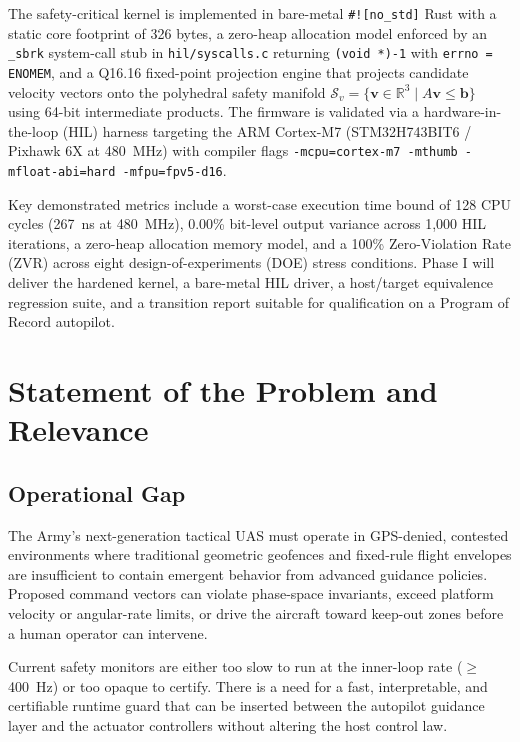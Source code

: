 \documentclass[11pt,oneside]{article}
\begin{document}
The safety-critical kernel is implemented in bare-metal \texttt{\#![no\_std]} Rust with a static core footprint of 326 bytes, a zero-heap allocation model enforced by an \texttt{\_sbrk} system-call stub in \texttt{hil/syscalls.c} returning \texttt{(void *)-1} with \texttt{errno = ENOMEM}, and a Q16.16 fixed-point projection engine that projects candidate velocity vectors onto the polyhedral safety manifold $\mathcal{S}_v = \{ \mathbf{v} \in \mathbb{R}^3 \mid A \mathbf{v} \le \mathbf{b} \}$ using 64-bit intermediate products. The firmware is validated via a hardware-in-the-loop (HIL) harness targeting the ARM Cortex-M7 (STM32H743BIT6 / Pixhawk 6X at 480~MHz) with compiler flags \texttt{-mcpu=cortex-m7 -mthumb -mfloat-abi=hard -mfpu=fpv5-d16}.

Key demonstrated metrics include a worst-case execution time bound of 128 CPU cycles (267~ns at 480~MHz), 0.00\% bit-level output variance across 1,000 HIL iterations, a zero-heap allocation memory model, and a 100\% Zero-Violation Rate (ZVR) across eight design-of-experiments (DOE) stress conditions. Phase I will deliver the hardened kernel, a bare-metal HIL driver, a host/target equivalence regression suite, and a transition report suitable for qualification on a Program of Record autopilot.

\section{Statement of the Problem and Relevance}


\subsection{Operational Gap}

The Army's next-generation tactical UAS must operate in GPS-denied, contested environments where traditional geometric geofences and fixed-rule flight envelopes are insufficient to contain emergent behavior from advanced guidance policies. Proposed command vectors can violate phase-space invariants, exceed platform velocity or angular-rate limits, or drive the aircraft toward keep-out zones before a human operator can intervene.

Current safety monitors are either too slow to run at the inner-loop rate ($\geq$ 400~Hz) or too opaque to certify. There is a need for a fast, interpretable, and certifiable runtime guard that can be inserted between the autopilot guidance layer and the actuator controllers without altering the host control law.
\end{document}
